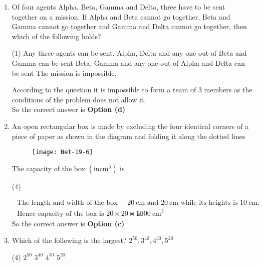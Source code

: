 \begin{enumerate}
\item  Of four agents Alpha, Beta, Gamma and Delta, three have to be sent together on a mission. If Alpha and Beta cannot go together, Beta and Gamma cannot go together and Gamma and Delta cannot go together, then which of the following holds?
 \begin{tasks}(1)
	\task[\textbf{a.}]Any three agents can be sent.
	\task[\textbf{b.}]Alpha, Delta and any one out of Beta and Gamma can be sent
	\task[\textbf{c.}] Beta, Gamma and any one out of Alpha and Delta can be sent
	\task[\textbf{d.}] The mission is impossible.
\end{tasks}
\begin{answer}
	According to the question it is impossible to form a team of 3 members as the conditions of the problem does not allow it.\\
So the correct answer is \textbf{Option (d)}
\end{answer}
\item  An open rectangular box is made by excluding the four identical corners of a piece of paper as shown in the diagram and folding it along the dotted lines
\begin{figure}[H]
	\centering
	\texttt{[image: Net-19-6]}
\end{figure}
The capacity of the box $\left(\mathrm{in} \mathrm{cm}^{3}\right)$ is
 \begin{tasks}(4)
\end{tasks}
\begin{answer}
	\begin{align*}
	\text { The length and width of the box are } &20 \mathrm{~cm} \text { and } 20 \mathrm{~cm} \text { while its heights is } 10 \mathrm{~cm} \text {. }\\
	\text { Hence capacity of the box is } 20 \times 20 \times 10&=4000 \mathrm{~cm}^{3}
	\end{align*}
	So the correct answer is \textbf{Option (c)}
\end{answer}
\item  Which of the following is the largest?
$
2^{50}, 3^{40}, 4^{30}, 5^{20}
$
 \begin{tasks}(4)
	\task[\textbf{a.}] $2^{50}$
	\task[\textbf{b.}]$3^{40}$
	\task[\textbf{c.}]$4^{30}$
	\task[\textbf{d.}]$5^{20}$ 
\end{tasks}
\begin{answer}
	\begin{align*}

\end{align*}
\end{answer}
\end{enumerate}
